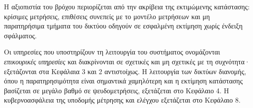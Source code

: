 Η αξιοπιστία του βρόχου περιορίζεται από την ακρίβεια της εκτιμώμενης κατάστασης: κρίσιμες
μετρήσεις, επιθέσεις συνεπείς με το μοντέλο μετρήσεων και μη παρατηρήσιμα τμήματα του
δικτύου οδηγούν σε εσφαλμένη εκτίμηση χωρίς ένδειξη σφάλματος.

Οι υπηρεσίες που υποστηρίζουν τη λειτουργία του συστήματος ονομάζονται \emph{επικουρικές
υπηρεσίες} και διακρίνονται σε σχετικές και μη σχετικές με τη συχνότητα· εξετάζονται στα
Κεφάλαια 3 και 2 αντιστοίχως. Η λειτουργία των δικτύων διανομής, όπου η παρατηρησιμότητα
είναι σημαντικά χαμηλότερη και η εκτίμηση κατάστασης βασίζεται σε μεγάλο βαθμό σε
ψευδομετρήσεις, εξετάζεται στο Κεφάλαιο 4. Η κυβερνοασφάλεια της υποδομής μέτρησης και
ελέγχου εξετάζεται στο Κεφάλαιο 8.
